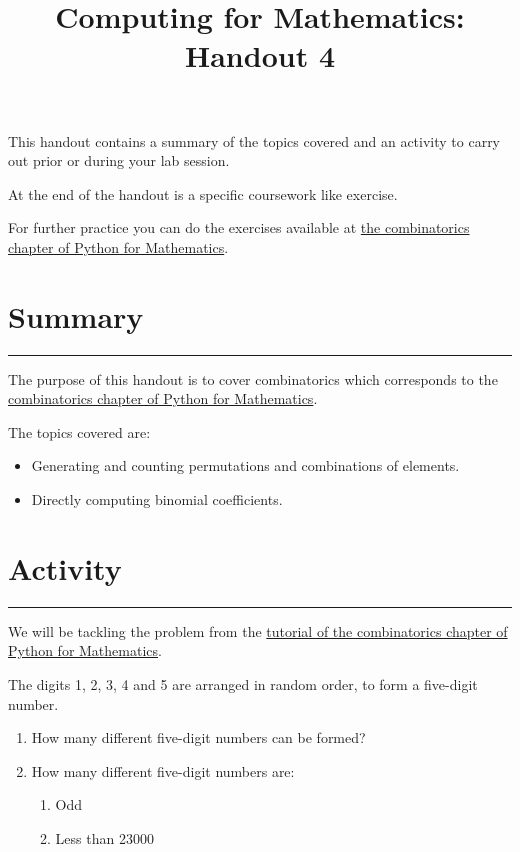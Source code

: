 \documentclass{article}
\title{Computing for Mathematics: Handout 4}
\date{}
\begin{document}
\maketitle


This handout contains a summary of the topics covered and an activity to
carry out prior or during your lab session.

At the end of the handout is a specific coursework like exercise.

For further practice you can do the exercises available at 
\href{https://vknight.org/pfm/tools-for-mathematics/05-combinations-permutations/introduction/main.html}{the
combinatorics chapter of Python for Mathematics}.

\section{Summary}\label{summary}
\hrule


The purpose of this handout is to cover combinatorics which
corresponds to the
\href{https://vknight.org/pfm/tools-for-mathematics/05-combinations-permutations/introduction/main.html}{combinatorics
chapter of Python for Mathematics}.

The topics covered are:

\begin{itemize}
\item
  Generating and counting permutations and combinations of elements.
\item
  Directly computing binomial coefficients. 
\end{itemize}


\section{Activity}\label{activity}
\hrule

We will be tackling the problem from the
\href{https://vknight.org/pfm/tools-for-mathematics/05-combinations-permutations/tutorial/main.html}{tutorial
of the combinatorics chapter of Python for Mathematics}.

The digits 1, 2, 3, 4 and 5 are arranged in random order, to form a five-digit number.

\begin{enumerate}
    \item How many different five-digit numbers can be formed?
    \item How many different five-digit numbers are:
        \begin{enumerate}
            \item Odd
            \item Less than 23000
        \end{enumerate}
\end{enumerate}
\end{document}
